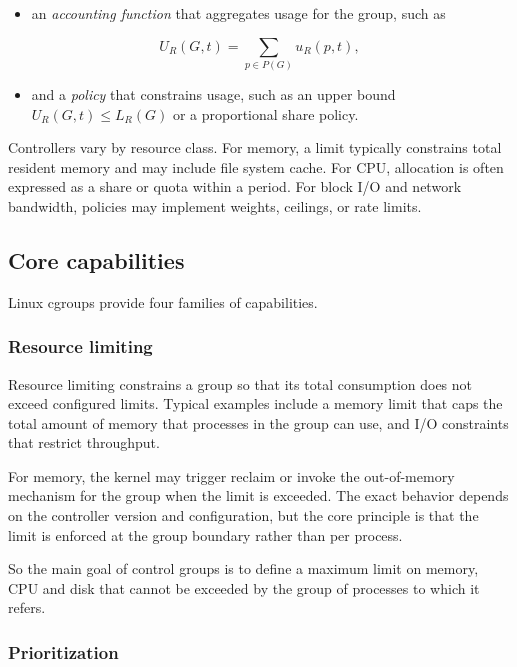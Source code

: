 \begin{itemize}
\item an \emph{accounting function} that aggregates usage for the group, such as
\end{itemize}

\[ U_R(G, t) = \sum_{p \in P(G)} u_R(p, t), \]

\begin{itemize}
\item and a \emph{policy} that constrains usage, such as an upper bound $U_R(G, t) \le L_R(G)$ or a proportional share policy.
\end{itemize}

Controllers vary by resource class. For memory, a limit typically constrains total resident memory and may include file system cache. For CPU, allocation is often expressed as a share or quota within a period. For block I/O and network bandwidth, policies may implement weights, ceilings, or rate limits.

\subsection{Core capabilities}

Linux cgroups provide four families of capabilities.

\subsubsection*{Resource limiting}

Resource limiting constrains a group so that its total consumption does not exceed configured limits. Typical examples include a memory limit that caps the total amount of memory that processes in the group can use, and I/O constraints that restrict throughput.

For memory, the kernel may trigger reclaim or invoke the out-of-memory mechanism for the group when the limit is exceeded. The exact behavior depends on the controller version and configuration, but the core principle is that the limit is enforced at the group boundary rather than per process.

So the main goal of control groups is to define a maximum limit on memory, CPU and disk that cannot be exceeded by the group of processes to which it refers.

\subsubsection*{Prioritization}


